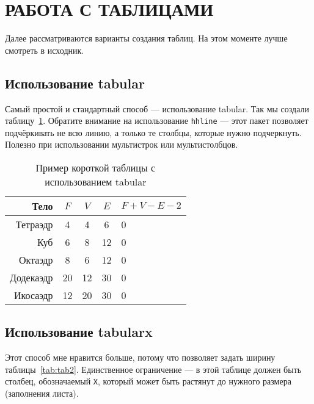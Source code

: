 \section{РАБОТА С ТАБЛИЦАМИ}

Далее рассматриваются варианты создания таблиц. 
На этом моменте лучше смотреть в исходник.

\subsection{Использование tabular}

Самый простой и стандартный способ --- использование tabular. 
Так мы создали таблицу~\ref{tab:tab1}. 
Обратите внимание на использование \texttt{hhline} --- этот пакет 
позволяет подчёркивать не всю линию, а только те столбцы, которые 
нужно подчеркнуть. Полезно при использовании мультистрок или мультистолбцов.

\begin{table}    
    \caption{Пример короткой таблицы с использованием tabular}
    \begin{tabular}{|r|c|c|c|l|}\hline
    Тело      & $F$ & $V$  & $E$ & $F+V-E-2$ \\ \hline
    Тетраэдр  & 4   & 4    & 6   & 0         \\ \hhline{~-~-~}
    Куб       & 6   & 8    & 12  & 0         \\ \hhline{--~~~}
    Октаэдр   & 8   & 6    & 12  & 0         \\ \hhline{-----}
    Додекаэдр & 20  & 12   & 30  & 0         \\ \hline
    Икосаэдр  & 12  & 20   & 30  & 0         \\ \hline
    \end{tabular}
    \label{tab:tab1}
\end{table}

\subsection{Использование tabularx}

Этот способ мне нравится больше, потому что позволяет задать ширину 
таблицы~\ref{tab:tab2}. Единственное ограничение --- в этой таблице должен 
быть столбец, обозначаемый \texttt{X}, который может быть растянут до 
нужного размера (заполнения листа).

